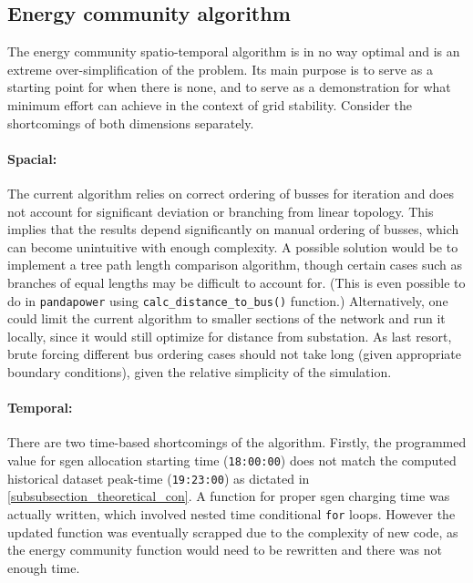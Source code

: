 \documentclass[a4paper,10pt]{report}
\begin{document}
\newpage
\subsection{Energy community algorithm}
The energy community spatio-temporal algorithm is in no way optimal and is an extreme over-simplification of the problem. Its main purpose is to serve as a starting point for when there is none, and to serve as a demonstration for what minimum effort can achieve in the context of grid stability. Consider the shortcomings of both dimensions separately.

\paragraph{Spacial:} The current algorithm relies on correct ordering of busses for iteration and does not account for significant deviation or branching from linear topology. This implies that the results depend significantly on manual ordering of busses, which can become unintuitive with enough complexity. A possible solution would be to implement a tree path length comparison algorithm, though certain cases such as branches of equal lengths may be difficult to account for. (This is even possible to do in \texttt{pandapower} using \texttt{calc\_distance\_to\_bus()} function.) Alternatively, one could limit the current algorithm to smaller sections of the network and run it locally, since it would still optimize for distance from substation. As last resort, brute forcing different bus ordering cases should not take long (given appropriate boundary conditions), given the relative simplicity of the simulation.

\paragraph{Temporal:} There are two time-based shortcomings of the algorithm. Firstly, the programmed value for sgen allocation starting time (\texttt{18:00:00}) does not match the computed historical dataset peak-time (\texttt{19:23:00}) as dictated in \cref{subsubsection_theoretical_con}. A function for proper sgen charging time was actually written, which involved nested time conditional \texttt{for} loops. However the updated function was eventually scrapped due to the complexity of new code, as the energy community function would need to be rewritten and there was not enough time.
\end{document}
